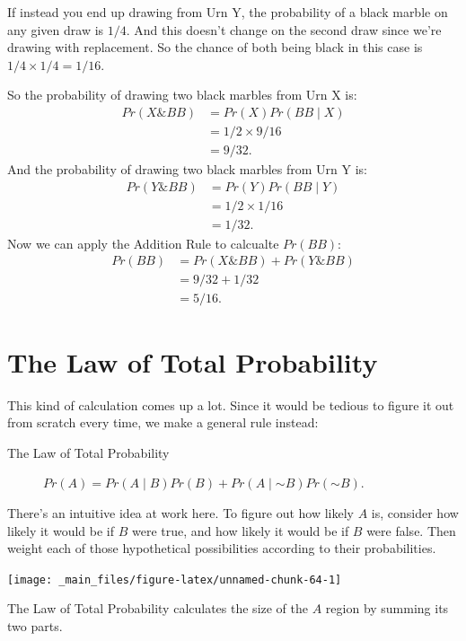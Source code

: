 \documentclass[justified]{tufte-book}
\newcommand{\given}{\mid}
\renewcommand{\neg}{\mathbin{\sim}}
\renewcommand{\wedge}{\mathbin{\&}}
\newcommand{\p}{Pr}
\theoremstyle{definition}
\theoremstyle{definition}
\theoremstyle{definition}
\theoremstyle{definition}
\theoremstyle{remark}
\begin{document}
If instead you end up drawing from Urn Y, the probability of a black marble on any given draw is \(1/4\). And this doesn't change on the second draw since we're drawing with replacement. So the chance of both being black in this case is \(1/4 \times 1/4 = 1/16\).

So the probability of drawing two black marbles from Urn X is:
\[
  \begin{aligned}
    \p(X \wedge BB) &= \p(X) \p(BB \given X)\\
                    &= 1/2 \times 9/16\\
                    &= 9/32.
  \end{aligned}
\]
And the probability of drawing two black marbles from Urn Y is:
\[
  \begin{aligned}
    \p(Y \wedge BB) &= \p(Y) \p(BB \given Y)\\
                    &= 1/2 \times 1/16\\
                    &= 1/32.
  \end{aligned}
\]
Now we can apply the Addition Rule to calcualte \(\p(BB)\):
\[
  \begin{aligned}
    \p(BB) &= \p(X \wedge BB) + \p(Y \wedge BB)\\
           &= 9/32 + 1/32\\
           &= 5/16.
  \end{aligned}
\]

\hypertarget{the-law-of-total-probability}{%
\section{The Law of Total Probability}\label{the-law-of-total-probability}}

This kind of calculation comes up a lot. Since it would be tedious to figure it out from scratch every time, we make a general rule instead:

\begin{description}
\item[The Law of Total Probability]
\(\p(A) = \p(A \given B) \p(B) + \p(A \given \neg B) \p(\neg B)\).
\end{description}

There's an intuitive idea at work here. To figure out how likely \(A\) is, consider how likely it would be if \(B\) were true, and how likely it would be if \(B\) were false. Then weight each of those hypothetical possibilities according to their probabilities.

\begin{marginfigure}
\texttt{[image: \_main\_files/figure-latex/unnamed-chunk-64-1]} \caption[The Law of Total Probability calculates the size of the $A$ region by summing its two parts]{The Law of Total Probability calculates the size of the $A$ region by summing its two parts.}\label{fig:unnamed-chunk-64}
\end{marginfigure}
\end{document}
